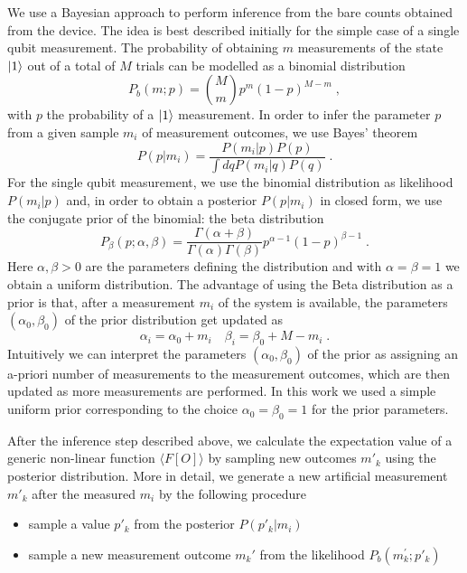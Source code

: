 \documentclass[10pt]{article}
\begin{document}
We use a Bayesian approach to perform inference from the bare counts obtained from the device. The idea is best described initially for the simple case of a single qubit measurement. The probability of obtaining $m$ measurements of the state $\ket{1}$ out of a total of $M$ trials can be modelled as a binomial distribution
\begin{equation}
P_b(m;p) =     \binom{M}{m}p^{m}(1-p)^{M-m}\;,
\end{equation}
with $p$ the probability of a $\ket{1}$ measurement. In order to infer the parameter $p$ from a given sample $m_i$ of measurement outcomes, we use Bayes' theorem
\begin{equation}
P(p|m_i) = \frac{P(m_i|p)P(p)}{\int dq P(m_i|q)P(q)}\;.
\end{equation}
For the single qubit measurement, we use the binomial distribution as likelihood $P(m_i|p)$ and, in order to obtain a posterior $P(p|m_i)$ in closed form, we use the conjugate prior of the binomial: the beta distribution
\begin{equation}
P_\beta(p;\alpha,\beta) = \frac{\Gamma(\alpha+\beta)}{\Gamma(\alpha)\Gamma(\beta)} p^{\alpha-1}(1-p)^{\beta-1}\;.
\end{equation}
Here $\alpha,\beta>0$ are the parameters defining the distribution and with $\alpha=\beta=1$ we obtain a uniform distribution. The advantage of using the Beta distribution as a prior is that, after a measurement $m_i$ of the system is available, the parameters $(\alpha_0,\beta_0)$ of the prior distribution get updated as
\begin{equation}
\alpha_i = \alpha_0 + m_i\quad\beta_i=\beta_0 + M-m_i\;.
\end{equation}
Intuitively we can interpret the parameters $(\alpha_0,\beta_0)$ of the prior as assigning an a-priori number of measurements to the measurement outcomes, which are then updated as more measurements are performed. In this work we used a simple uniform prior corresponding to the choice $\alpha_0=\beta_0=1$ for the prior parameters.

After the inference step described above, we calculate the expectation value of a generic non-linear function $\langle F[O]\rangle$ by sampling new outcomes $m'_k$ using the posterior distribution. More in detail, we generate a new artificial measurement $m'_k$ after the measured $m_i$ by the following procedure
\begin{itemize}
    \item sample a value $p'_k$ from the posterior $P(p'_k\lvert m_i)$ 
	\item sample a new measurement outcome $m_k'$ from the likelihood $P_b(m_k^\prime;p'_k)$
\end{itemize}
\end{document}

